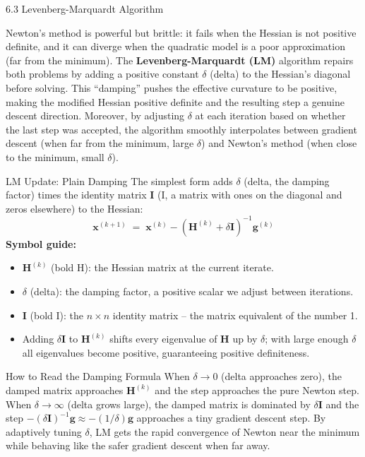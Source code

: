 \documentclass[aspectratio=169,10pt]{beamer}
\newcommand{\xbf}{\mathbf{x}}
\newcommand{\gbf}{\mathbf{g}}
\newcommand{\Hbf}{\mathbf{H}}
\newcommand{\Ibf}{\mathbf{I}}
\begin{document}
\begin{frame}[allowframebreaks]{6.3 Levenberg-Marquardt Algorithm}

  Newton's method is powerful but brittle: it fails when the Hessian is not
  positive definite, and it can diverge when the quadratic model is a poor
  approximation (far from the minimum).  The \textbf{Levenberg-Marquardt (LM)}
  algorithm repairs both problems by adding a positive constant $\delta$ (delta)
  to the Hessian's diagonal before solving.  This ``damping'' pushes the
  effective curvature to be positive, making the modified Hessian positive
  definite and the resulting step a genuine descent direction.  Moreover, by
  adjusting $\delta$ at each iteration based on whether the last step was
  accepted, the algorithm smoothly interpolates between gradient descent (when far
  from the minimum, large $\delta$) and Newton's method (when close to the
  minimum, small $\delta$).

  \begin{block}{LM Update: Plain Damping}
    The simplest form adds $\delta$ (delta, the damping factor) times the
    identity matrix $\mathbf{I}$ (I, a matrix with ones on the diagonal and
    zeros elsewhere) to the Hessian:
    \[
      \xbf^{(k+1)} \;=\; \xbf^{(k)} - \left(\Hbf^{(k)} + \delta\Ibf\right)^{-1}\gbf^{(k)}
    \]
    \textbf{Symbol guide:}
    \begin{itemize}
      \item $\Hbf^{(k)}$ (bold H): the Hessian matrix at the current iterate.
      \item $\delta$ (delta): the damping factor, a positive scalar we adjust
        between iterations.
      \item $\Ibf$ (bold I): the $n\times n$ identity matrix -- the matrix
        equivalent of the number 1.
      \item Adding $\delta\Ibf$ to $\Hbf^{(k)}$ shifts every eigenvalue of $\Hbf$
        up by $\delta$; with large enough $\delta$ all eigenvalues become positive,
        guaranteeing positive definiteness.
    \end{itemize}
  \end{block}

  \begin{alertblock}{How to Read the Damping Formula}
    When $\delta \to 0$ (delta approaches zero), the damped matrix approaches
    $\Hbf^{(k)}$ and the step approaches the pure Newton step.  When $\delta \to
    \infty$ (delta grows large), the damped matrix is dominated by $\delta\Ibf$
    and the step $-(\delta\Ibf)^{-1}\gbf \approx -(1/\delta)\gbf$ approaches a
    tiny gradient descent step.  By adaptively tuning $\delta$, LM gets the
    rapid convergence of Newton near the minimum while behaving like the safer
    gradient descent when far away.
  \end{alertblock}


\end{frame}
\end{document}
